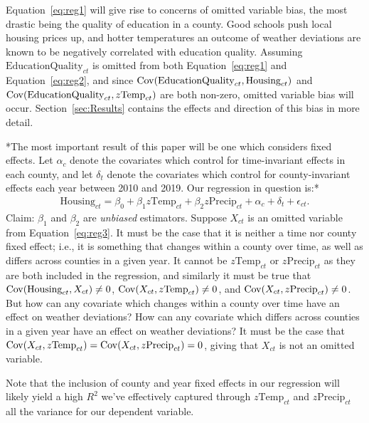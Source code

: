 \documentclass[12pt,reqno]{amsart}
\theoremstyle{definition}
\begin{document}
    

    Equation~\ref{eq:reg1} will give rise to concerns of omitted variable bias, the most drastic being the quality of education in a county. Good schools push local housing prices up, and hotter temperatures \textemdash an outcome of weather deviations \textemdash are known to be negatively correlated with education quality. Assuming $\text{EducationQuality}_{ct}$ is omitted from both Equation~\ref{eq:reg1} and Equation~\ref{eq:reg2}, and since $\operatorname{Cov}(\text{EducationQuality}_{ct}, \text{Housing}_{ct}) $ and $\operatorname{Cov}(\text{EducationQuality}_{ct}, z\text{Temp}_{ct})$ are both non-zero, omitted variable bias will occur. Section~\ref{sec:Results} contains the effects and direction of this bias in more detail.

    *The most important result of this paper will be one which considers fixed effects. Let $\alpha_c$ denote the covariates which control for time-invariant effects in each county, and let $\delta_t$ denote the covariates which control for county-invariant effects each year between 2010 and 2019. Our regression in question is:*
        \begin{equation}\label{eq:reg3}
        \begin{split}
            \text{Housing}_{ct} = \beta_0 + \beta_1z\text{Temp}_{ct} + \beta_2 z\text{Precip}_{ct} + \alpha_c + \delta_t + \epsilon_{ct}.
        \end{split}
        \end{equation}
    Claim: $\beta_1$ and $\beta_2$ are \textit{unbiased} estimators. Suppose $X_{ct}$ is an omitted variable from Equation~\ref{eq:reg3}. It must be the case that it is neither a time nor county fixed effect; i.e., it is something that changes within a county over time, as well as differs across counties in a given year. It cannot be $z\text{Temp}_{ct}$ or $z\text{Precip}_{ct}$ as they are both included in the regression, and similarly it must be true that $\operatorname{Cov}(\text{Housing}_{ct},X_{ct}) \neq 0$, $\operatorname{Cov}(X_{ct},z\text{Temp}_{ct}) \neq 0$, and $\operatorname{Cov}(X_{ct},z\text{Precip}_{ct}) \neq 0$. But how can any covariate which changes within a county over time have an effect on weather deviations? How can any covariate which differs across counties in a given year have an effect on weather deviations? It must be the case that $\operatorname{Cov}(X_{ct},z\text{Temp}_{ct}) = \operatorname{Cov}(X_{ct},z\text{Precip}_{ct}) = 0$, giving that $X_{ct}$ is not an omitted variable. 

    Note that the inclusion of county and year fixed effects in our regression will likely yield a high $R^2$ \textemdash we've effectively captured through $z\text{Temp}_{ct}$ and $z\text{Precip}_{ct}$ all the variance for our dependent variable.
\end{document}
